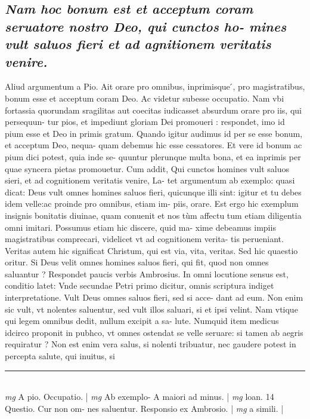 \documentclass{article}
\begin{document}
\begin{pages}
\subsection*{\textit{Nam hoc bonum est et acceptum coram seruatore nostro Deo, qui cunctos ho- mines vult saluos fieri et ad agnitionem veritatis venire. }}\pstart Aliud argumentum a Pio. Ait orare pro omnibus, inprimisque ́, pro magistratibus, bonum esse et acceptum coram Deo. Ac videtur subesse occupatio. Nam vbi fortassia quorundam sragilitas aut coecitas iudicasset absurdum orare pro iis, qui persequun- tur pios, et impediunt gloriam Dei promoueri : respondet, imo id pium esse et Deo in primis gratum. Quando igitur audimus id per se esse bonum, et acceptum Deo, nequa- quam debemus hic esse cessatores. Et vere id bonum ac pium dici potest, quia inde se- quuntur plerunque  multa bona, et ea inprimis per quae syncera pietas promouetur. Cum addit, Qui cunctos homines vult saluos sieri, et ad cognitionem veritatis venire, La- tet argumentum ab exemplo: quasi dicat: Deus vult omnes homines saluos fieri, quicunque illi sint: igitur et tu debes idem velle:ac proinde pro omnibus, etiam im- piis, orare. Est ergo hic exemplum insignis bonitatis diuinae, quam conuenit et nos tùm affectu tum etiam diligentia omni imitari. Possumus etiam hic discere, quid ma- xime debeamus impiis magistratibus comprecari, videlicet vt ad cognitionem verita- tis perueniant. Veritas autem hic significat Christum, qui est via, vita, veritas. Sed hic quaestio oritur. Si Deus velit omnes homines saluos fieri, qui fit, quod non omnes saluantur ? Respondet paucis verbis Ambrosius. In omni locutione sensus est, conditio latet: Vnde secundae Petri primo dicitur, omnis scriptura indiget interpretatione. Vult Deus omnes saluos fieri, sed si acce- dant ad eum. Non enim sic vult, vt nolentes saluentur, sed vult illos saluari, si et ipsi velint. Nam vtique qui legem omnibus dedit, nullum excipit a sa- lute. Numquid item medicus idcirco proponit in pubhco, vt omnes ostendat se velle seruare: si tamen ab aegris requiratur ? Non est enim vera salus, si nolenti tribuatur, nec gaudere potest in percepta salute, qui inuitus, si  \pend
\vspace{0.5cm}\noindent
\vspace{0.2cm}\rule{1cm}{0.2pt}\\ 
\hspace{0.2cm}\textit{mg}
\footnotesize A pio. Occupatio. 
\normalsize| 
\hspace{0.2cm}\textit{mg}
\footnotesize Ab exemplo- A maiori ad minus. 
\normalsize| 
\hspace{0.2cm}\textit{mg}
\footnotesize loan. 14 Questio. Cur non om- nes saluentur. Responsio ex Ambrosio. 
\normalsize| 
\hspace{0.2cm}\textit{mg}
\footnotesize a simili. 
\normalsize| 

\end{pages}
\end{document}
